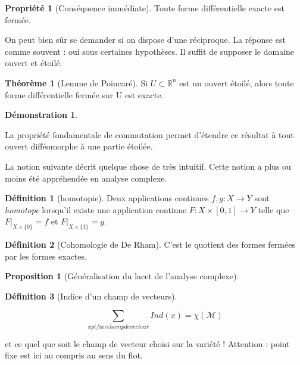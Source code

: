 \documentclass{article}
\newcommand{\R}{\mathbb{R}} %
\theoremstyle{definition} %
\newtheorem{defi}{Définition}
\newtheorem{thm}{Théorème}
\newtheorem{prop}{Proposition}
\newtheorem{dem}{Démonstration}
\newtheorem{propri}{Propriété}
\newcommand{\1}{\mathbb{1}} %
\begin{document}
\begin{propri}[Conséquence immédiate]
Toute forme différentielle exacte est fermée.
\end{propri}

On peut bien sûr se demander si on dispose d'une réciproque. La réponse est comme souvent : oui sous certaines hypothèses. Il suffit de supposer le domaine ouvert et étoilé.

\begin{thm}[Lemme de Poincaré]
Si $U \subset \R^n$ est un ouvert étoilé, alors toute forme différentielle fermée sur U est exacte.
\end{thm}

\begin{dem}

\end{dem}

La propriété fondamentale de commutation permet d'étendre ce résultat à tout ouvert difféomorphe à une partie étoilée.




La notion suivante décrit quelque chose de très intuitif. Cette notion a plus ou moins été appréhendée en analyse complexe.
\begin{defi}[homotopie]
Deux applications continues $f,g: X\to Y$ sont \textit{homotope} lorsqu'il existe une application continue $F:X\times [0,1]\to Y$ telle que $F|_{X \times \{0\}}=f$ et $F|_{X\times \{1\}}=g$.
\end{defi}

\begin{defi}[Cohomologie de De Rham]
C'est le quotient des formes fermées par les formes exactes.
\end{defi}

\begin{prop}[Généralisation du lacet de l'analyse complexe]
\end{prop}

\begin{defi}[Indice d'un champ de vecteurs]
\end{defi}

\begin{tcolorbox}[colback=blue!5!white,colframe=blue!75!black,title=Théorème]
$$\sum_{x pt fixe champ de vecteur} Ind (x) = \chi (\mathcal{M})$$
\end{tcolorbox}
et ce quel que soit le champ de vecteur choisi sur la variété !
Attention : point fixe est ici au compris au sens du flot.
\end{document}
